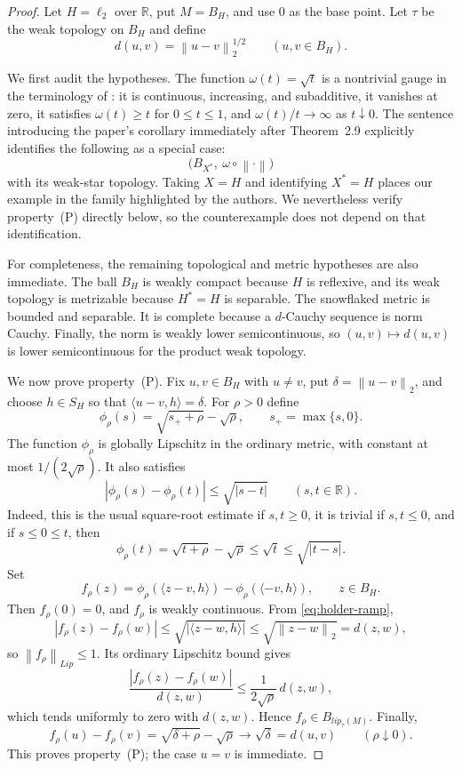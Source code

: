 \documentclass[11pt]{article}
\newcommand{\R}{\mathbb{R}}
\newcommand{\ellTwo}{\ell_2}
\newcommand{\norm}[1]{\left\lVert #1\right\rVert}
\begin{document}
\begin{proof}
Let $H=\ellTwo$ over $\R$, put $M=B_H$, and use $0$ as the base point. Let
$\tau$ be the weak topology on $B_H$ and define
\[
 d(u,v)=\norm{u-v}_2^{1/2}\qquad(u,v\in B_H).
\]

We first audit the hypotheses. The function $\omega(t)=\sqrt t$ is a
nontrivial gauge in the terminology of \cite{GPRZ}: it is continuous,
increasing, and subadditive, it vanishes at zero, it satisfies
$\omega(t)\ge t$ for $0\le t\le1$, and
$\omega(t)/t\to\infty$ as $t\downarrow0$. The sentence introducing the
paper's corollary immediately after Theorem~2.9 explicitly identifies the
following as a special case:
\[
 \bigl(B_{X^*},\ \omega\circ\norm{\mathord\cdot}\bigr)
\]
with its weak-star topology. Taking $X=H$ and identifying $X^*=H$ places our
example in the family highlighted by the authors. We nevertheless verify
property~(P) directly below, so the counterexample does not depend on that
identification.

For completeness, the remaining topological and metric hypotheses are also
immediate. The ball $B_H$ is weakly compact because $H$ is reflexive, and its
weak topology is metrizable because $H^*=H$ is separable. The snowflaked
metric is bounded and separable. It is complete because a $d$-Cauchy sequence
is norm Cauchy. Finally, the norm is weakly lower semicontinuous, so
$(u,v)\mapsto d(u,v)$ is lower semicontinuous for the product weak topology.

We now prove property~(P). Fix $u,v\in B_H$ with $u\ne v$, put
$\delta=\norm{u-v}_2$, and choose $h\in S_H$ so that
$\langle u-v,h\rangle=\delta$. For $\rho>0$ define
\[
 \phi_\rho(s)=\sqrt{s_++\rho}-\sqrt\rho,
 \qquad s_+=\max\{s,0\}.
\]
The function $\phi_\rho$ is globally Lipschitz in the ordinary metric, with
constant at most $1/(2\sqrt\rho)$. It also satisfies
\begin{equation}\label{eq:holder-ramp}
 |\phi_\rho(s)-\phi_\rho(t)|\le\sqrt{|s-t|}
 \qquad(s,t\in\R).
\end{equation}
Indeed, this is the usual square-root estimate if $s,t\ge0$, it is trivial if
$s,t\le0$, and if $s\le0\le t$, then
\[
 \phi_\rho(t)=\sqrt{t+\rho}-\sqrt\rho
 \le\sqrt t\le\sqrt{|t-s|}.
\]
Set
\[
 f_\rho(z)=\phi_\rho(\langle z-v,h\rangle)
            -\phi_\rho(\langle -v,h\rangle),
 \qquad z\in B_H.
\]
Then $f_\rho(0)=0$, and $f_\rho$ is weakly continuous. From
\eqref{eq:holder-ramp},
\[
 |f_\rho(z)-f_\rho(w)|
 \le\sqrt{|\langle z-w,h\rangle|}
 \le\sqrt{\norm{z-w}_2}=d(z,w),
\]
so $\norm{f_\rho}_{Lip}\le1$. Its ordinary Lipschitz bound gives
\[
 \frac{|f_\rho(z)-f_\rho(w)|}{d(z,w)}
 \le \frac{1}{2\sqrt\rho}\,d(z,w),
\]
which tends uniformly to zero with $d(z,w)$. Hence
$f_\rho\in B_{lip_\tau(M)}$. Finally,
\[
 f_\rho(u)-f_\rho(v)
 =\sqrt{\delta+\rho}-\sqrt\rho
 \longrightarrow\sqrt\delta=d(u,v)
 \qquad(\rho\downarrow0).
\]
This proves property~(P); the case $u=v$ is immediate.


\end{proof}
\end{document}
